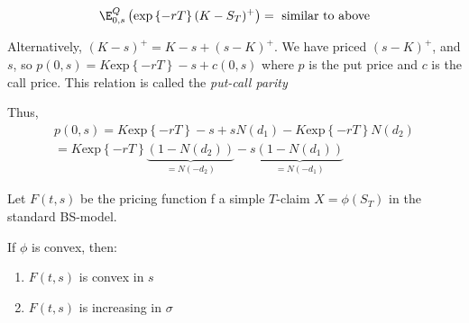 \begin{equation*}
  \begin{gathered}
    \E_{0,s}^Q\left(\text{exp}\left\{-rT\right\}(K-S_T)^+\right)=\text{ similar to above}
  \end{gathered}
\end{equation*}\par
\noindent Alternatively, $(K-s)^+ = K-s+(s-K)^+$. We have priced $(s-K)^+$, and $s$, so $p(0,s) = K\text{exp}\left\{-rT\right\}-s+c(0,s)$ where $p$ is the put price and $c$ is the call price. This relation is called the \textit{put-call parity}\par
\noindent Thus,
\begin{equation*}
  \begin{gathered}
    p(0,s) = K\text{exp}\left\{-rT\right\}-s+sN(d_1)-K\text{exp}\left\{-rT\right\}N(d_2)\\
    =K\text{exp}\left\{-rT\right\}\underbrace{(1-N(d_2))}_{=N(-d_2)}-s\underbrace{(1-N(d_1))}_{=N(-d_1)}
  \end{gathered}
\end{equation*}
\par\bigskip
\begin{theo}[]{}
  Let $F(t,s)$ be the pricing function f a simple $T$-claim $X = \phi(S_T)$ in the standard BS-model.\par
  \noindent If $\phi$ is convex, then:\par
  \begin{enumerate}[leftmargin=*]
    \item $F(t,s)$ is convex in $s$
    \item $F(t,s)$ is increasing in $\sigma$
  \end{enumerate}
\end{theo}
\par\bigskip

